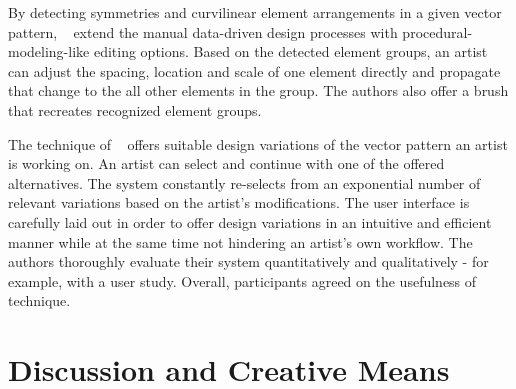 By detecting symmetries and curvilinear element arrangements in a given vector pattern, \citeauthor*{yeh_2009_dsa}~\cite{yeh_2009_dsa} extend the manual data-driven design processes with procedural-modeling-like editing options. Based on the detected element groups, an artist can adjust the spacing, location and scale of one element directly and propagate that change to the all other elements in the group. The authors also offer a brush that recreates recognized element groups.

The technique of \citeauthor*{guerrero_2016_pep}~\cite{guerrero_2016_pep} offers suitable design variations of the vector pattern an artist is working on. An artist can select and continue with one of the offered alternatives. The system constantly re-selects from an exponential number of relevant variations based on the artist's modifications. The user interface is carefully laid out in order to offer design variations in an intuitive and efficient manner while at the same time not hindering an artist's own workflow. The authors thoroughly evaluate their system quantitatively and qualitatively - for example, with a user study. Overall, participants agreed on the usefulness of technique.






\section{Discussion and Creative Means}
\label{subsec:analysis_creative_means}




